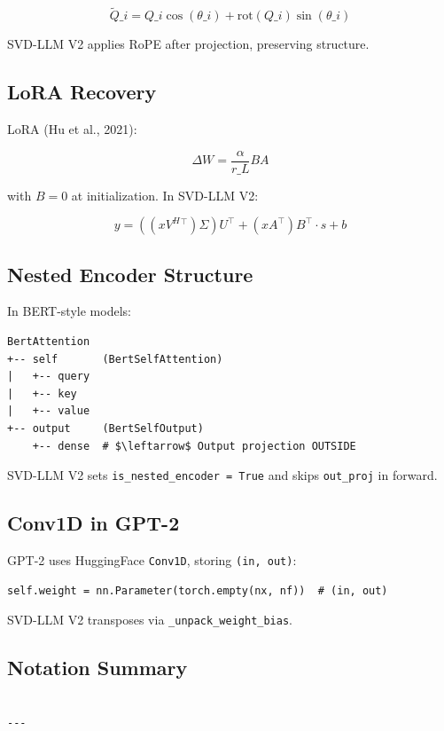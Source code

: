 \[
\tilde{Q}\_i = Q\_i \cos(\theta\_i) + \text{rot}(Q\_i) \sin(\theta\_i)
\tag{3.10}
\]

SVD-LLM V2 applies RoPE after projection, preserving structure.

\subsection{LoRA Recovery}

LoRA (Hu et al., 2021):

\[
\Delta W = \frac{\alpha}{r\_L} B A
\tag{3.11}
\]

with $B = 0$ at initialization. In SVD-LLM V2:

\[
y = ((x V^H{}^\top) \Sigma) U^\top + (x A^\top) B^\top \cdot s + b
\tag{3.12}
\]

\subsection{Nested Encoder Structure}

In BERT-style models:

\begin{lstlisting}
BertAttention
+-- self       (BertSelfAttention)
|   +-- query
|   +-- key
|   +-- value
+-- output     (BertSelfOutput)
    +-- dense  # $\leftarrow$ Output projection OUTSIDE
\end{lstlisting}

SVD-LLM V2 sets \texttt{is\_nested\_encoder = True} and skips \texttt{out\_proj} in forward.

\subsection{Conv1D in GPT-2}

GPT-2 uses HuggingFace \texttt{Conv1D}, storing \texttt{(in, out)}:

\begin{lstlisting}
self.weight = nn.Parameter(torch.empty(nx, nf))  # (in, out)
\end{lstlisting}

SVD-LLM V2 transposes via \texttt{\_unpack\_weight\_bias}.

\subsection{Notation Summary}

\begin{lstlisting}

---
\end{lstlisting}

